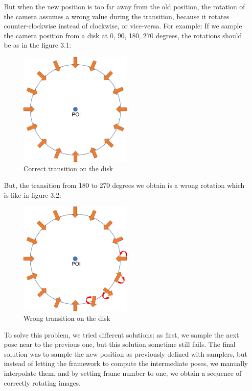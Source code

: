 But when the new position is too far away from the old position, the rotation of the camera assumes a wrong value during the transition, because it rotates counter-clockwise instead of clockwise, or vice-versa.
For example:
If we sample the camera position from a disk at 0, 90, 180, 270 degrees, the rotations should be as in the figure 3.1:
\begin{figure}[H]
    \centering
    \includegraphics[width=0.5\textwidth]{images/3_correct_transitions}
    \caption{Correct transition on the disk}\label{fig:correct-transition}
\end{figure}

But, the transition from 180 to 270 degrees we obtain is a wrong rotation which is like in figure 3.2:
\begin{figure}[H]
    \centering
    \includegraphics[width=0.5\textwidth]{images/3_wrong_transitions}
    \caption{Wrong transition on the disk}\label{fig:wrong-transition}
\end{figure}

To solve this problem, we tried different solutions: as first, we sample the next pose near to the previous one, but this solution sometime still fails.
The final solution was to sample the new position as previously defined with samplers, but instead of letting the framework to compute the intermediate poses, we manually interpolate them, and by setting frame number to one, we obtain a sequence of correctly rotating images.

